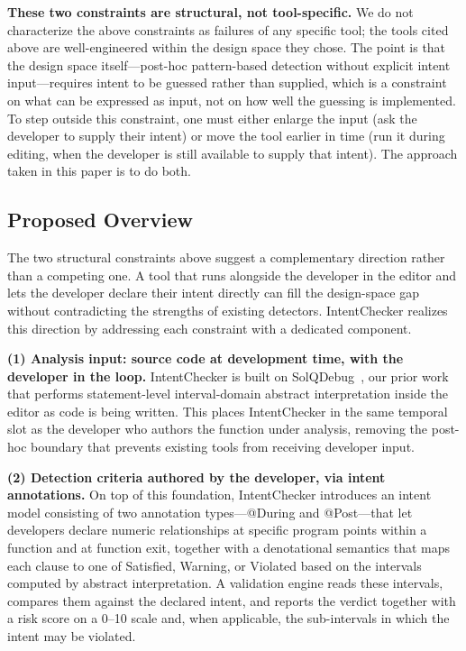 \documentclass[pdflatex,sn-basic]{sn-jnl}%
\theoremstyle{thmstyleone}%
\theoremstyle{thmstyletwo}%
\theoremstyle{thmstylethree}%
\begin{document}
\smallskip
\noindent\textbf{These two constraints are structural, not tool-specific.}
We do not characterize the above constraints as failures of any specific tool; the tools cited above are well-engineered within the design space they chose.
The point is that the design space itself---post-hoc pattern-based detection without explicit intent input---requires intent to be guessed rather than supplied, which is a constraint on what can be expressed as input, not on how well the guessing is implemented.
To step outside this constraint, one must either enlarge the input (ask the developer to supply their intent) or move the tool earlier in time (run it during editing, when the developer is still available to supply that intent).
The approach taken in this paper is to do both.

\subsection{Proposed Overview}\label{sec:proposed-overview}

The two structural constraints above suggest a complementary direction rather than a competing one.
A tool that runs alongside the developer in the editor and lets the developer declare their intent directly can fill the design-space gap without contradicting the strengths of existing detectors.
IntentChecker realizes this direction by addressing each constraint with a dedicated component.

\smallskip
\noindent\textbf{(1) Analysis input: source code at development time, with the developer in the loop.}
IntentChecker is built on SolQDebug~\citep{solqdebug}, our prior work that performs statement-level interval-domain abstract interpretation inside the editor as code is being written.
This places IntentChecker in the same temporal slot as the developer who authors the function under analysis, removing the post-hoc boundary that prevents existing tools from receiving developer input.

\smallskip
\noindent\textbf{(2) Detection criteria authored by the developer, via intent annotations.}
On top of this foundation, IntentChecker introduces an intent model consisting of two annotation types---@During and @Post---that let developers declare numeric relationships at specific program points within a function and at function exit, together with a denotational semantics that maps each clause to one of Satisfied, Warning, or Violated based on the intervals computed by abstract interpretation.
A validation engine reads these intervals, compares them against the declared intent, and reports the verdict together with a risk score on a 0--10 scale and, when applicable, the sub-intervals in which the intent may be violated.
\end{document}
